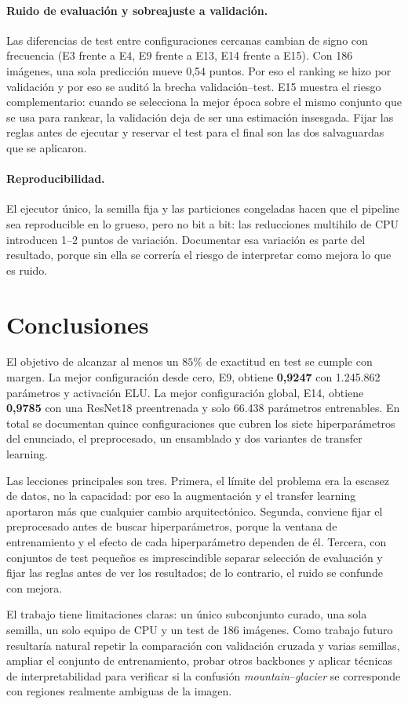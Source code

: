 \documentclass[11pt,a4paper]{article}
\begin{document}
\paragraph{Ruido de evaluación y sobreajuste a validación.}
Las diferencias de test entre configuraciones cercanas cambian de signo con frecuencia (E3 frente a E4, E9 frente a E13, E14 frente a E15). Con 186 imágenes, una sola predicción mueve 0,54 puntos. Por eso el ranking se hizo por validación y por eso se auditó la brecha validación--test. E15 muestra el riesgo complementario: cuando se selecciona la mejor época sobre el mismo conjunto que se usa para rankear, la validación deja de ser una estimación insesgada. Fijar las reglas antes de ejecutar y reservar el test para el final son las dos salvaguardas que se aplicaron.

\paragraph{Reproducibilidad.}
El ejecutor único, la semilla fija y las particiones congeladas hacen que el pipeline sea reproducible en lo grueso, pero no bit a bit: las reducciones multihilo de CPU introducen 1--2 puntos de variación. Documentar esa variación es parte del resultado, porque sin ella se correría el riesgo de interpretar como mejora lo que es ruido.

\section{Conclusiones}

El objetivo de alcanzar al menos un $85\%$ de exactitud en test se cumple con margen. La mejor configuración desde cero, E9, obtiene \textbf{0,9247} con 1.245.862 parámetros y activación ELU. La mejor configuración global, E14, obtiene \textbf{0,9785} con una ResNet18 preentrenada y solo 66.438 parámetros entrenables. En total se documentan quince configuraciones que cubren los siete hiperparámetros del enunciado, el preprocesado, un ensamblado y dos variantes de transfer learning.

Las lecciones principales son tres. Primera, el límite del problema era la escasez de datos, no la capacidad: por eso la augmentación y el transfer learning aportaron más que cualquier cambio arquitectónico. Segunda, conviene fijar el preprocesado antes de buscar hiperparámetros, porque la ventana de entrenamiento y el efecto de cada hiperparámetro dependen de él. Tercera, con conjuntos de test pequeños es imprescindible separar selección de evaluación y fijar las reglas antes de ver los resultados; de lo contrario, el ruido se confunde con mejora.

El trabajo tiene limitaciones claras: un único subconjunto curado, una sola semilla, un solo equipo de CPU y un test de 186 imágenes. Como trabajo futuro resultaría natural repetir la comparación con validación cruzada y varias semillas, ampliar el conjunto de entrenamiento, probar otros backbones y aplicar técnicas de interpretabilidad para verificar si la confusión \emph{mountain}--\emph{glacier} se corresponde con regiones realmente ambiguas de la imagen.


\end{document}
